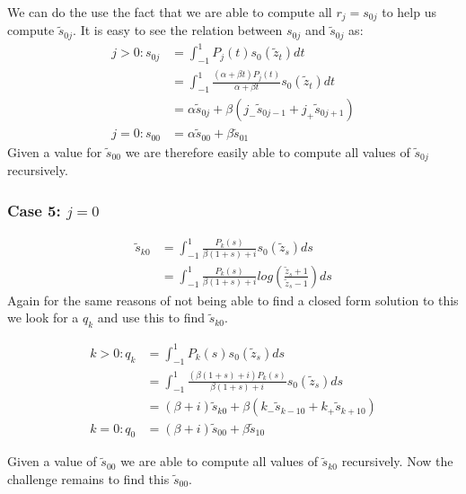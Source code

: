 \documentclass{article}
\begin{document}
We can do the use the fact that we are able to compute all $r_j=s_{0j}$ to help us compute $\tilde{s}_{0j}$.
It is easy to see the relation between $s_{0j}$ and $\tilde{s}_{0j}$ as:
\begin{align}
    j>0 : s_{0j}&=\int_{-1}^1P_j(t)s_0(\tilde{z}_t)dt\\
    &=\int_{-1}^1\frac{(\alpha+\beta t)P_j(t)}{\alpha+\beta t}s_0(\tilde{z}_t)dt\\
    &=\alpha \tilde{s}_{0j} + \beta(j_-\tilde{s}_{0j-1}+j_+\tilde{s}_{0j+1})\\
    j=0 : s_{00}&=\alpha\tilde{s}_{00}+\beta\tilde{s}_{01}
\end{align}
Given a value for $\tilde{s}_{00}$ we are therefore easily able to compute all values of $\tilde{s}_{0j}$ recursively.

\subsubsection*{Case 5: $j=0$}
\begin{align}
    \tilde{s}_{k0} &= \int_{-1}^1\frac{P_k(s)}{\beta(1+s)+i}s_0(\tilde{z}_s)ds\\
    &= \int_{-1}^1\frac{P_k(s)}{\beta(1+s)+i}log(\frac{\tilde{z}_s+1}{\tilde{z}_s-1})ds
\end{align}
Again for the same reasons of not being able to find a closed form solution to this we look for a $q_k$ and use this to find $\tilde{s}_{k0}$.

\begin{align}
    k>0 : q_k &= \int_{-1}^1P_k(s)s_0(\tilde{z}_s)ds\\
    &= \int_{-1}^1\frac{(\beta(1+s)+i)P_k(s)}{\beta(1+s)+i}s_0(\tilde{z}_s)ds\\
    &= (\beta+i)\tilde{s}_{k0} + \beta(k_-\tilde{s}_{k-10}+k_+\tilde{s}_{k+10})\\
    k=0 : q_0 &= (\beta+i)\tilde{s}_{00}+\beta\tilde{s}_{10}
\end{align}

Given a value of $\tilde{s}_{00}$ we are able to compute all values of $\tilde{s}_{k0}$ recursively.
Now the challenge remains to find this $\tilde{s}_{00}$.
\end{document}

